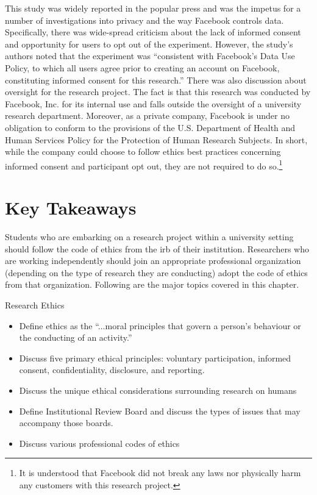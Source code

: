 This study was widely reported in the popular press and was the impetus for a number of investigations into privacy and the way Facebook controls data. Specifically, there was wide-spread criticism about the lack of informed consent and opportunity for users to opt out of the experiment. However, the study's authors noted that the experiment was ``consistent with Facebook's Data Use Policy, to which all users agree prior to creating an account on Facebook, constituting informed consent for this research.'' There was also discussion about oversight for the research project. The fact is that this research was conducted by Facebook, Inc. for its internal use and falls outside the oversight of a university research department. Moreover, as a private company, Facebook is under no obligation to conform to the provisions of the U.S. Department of Health and Human Services Policy for the Protection of Human Research Subjects. In short, while the company could choose to follow ethics best practices concerning informed consent and participant opt out, they are not required to do so.\footnote{It is understood that Facebook did not break any laws nor physically harm any customers with this research project.}

\section{Key Takeaways}

Students who are embarking on a research project within a university setting should follow  the code of ethics from the \gls{irb} of their institution. Researchers who are working independently should join an appropriate professional organization (depending on the type of research they are conducting) adopt the code of ethics from that organization. Following are the major topics covered in this chapter.

\begin{center}
	\begin{tkawybox}{Research Ethics}
		\begin{itemize}
			\setlength{\itemsep}{0pt}
			\setlength{\parskip}{0pt}
			\setlength{\parsep}{0pt}
			
			\item Define ethics as the ``...moral principles that govern a person's behaviour or the conducting of an activity.''
			\item Discuss five primary ethical principles: voluntary participation, informed consent, confidentiality, disclosure, and reporting.
			\item Discuss the unique ethical considerations surrounding research on humans
			\item Define Institutional Review Board and discuss the types of issues that may accompany those boards.
			\item Discuss various professional codes of ethics
		\end{itemize}
	\end{tkawybox}
\end{center}


